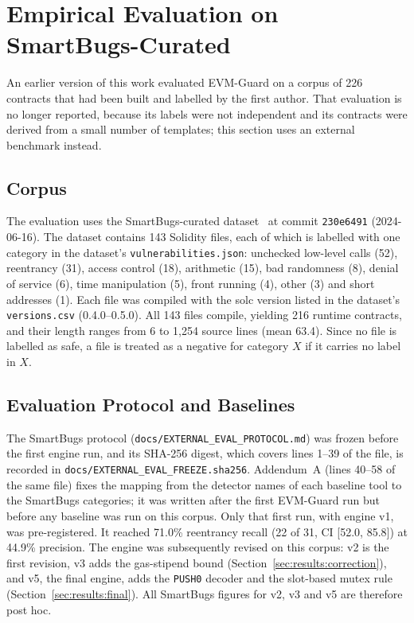 \documentclass[pdflatex,sn-mathphys]{sn-jnl}
\theoremstyle{thmstyletwo}
\theoremstyle{thmstyletwo}
\begin{document}
\section{Empirical Evaluation on SmartBugs-Curated}\label{sec:results}

An earlier version of this work evaluated EVM-Guard on a corpus of 226 contracts that had been built and labelled by the first author. That evaluation is no longer reported, because its labels were not independent and its contracts were derived from a small number of templates; this section uses an external benchmark instead.

\subsection{Corpus}\label{sec:results:corpus}
The evaluation uses the SmartBugs-curated dataset~\cite{durieux2020empirical,ferreira2020smartbugs} at commit \texttt{230e6491} (2024-06-16). The dataset contains 143 Solidity files, each of which is labelled with one category in the dataset's \texttt{vulnerabilities.json}: unchecked low-level calls (52), reentrancy (31), access control (18), arithmetic (15), bad randomness (8), denial of service (6), time manipulation (5), front running (4), other (3) and short addresses (1). Each file was compiled with the solc version listed in the dataset's \texttt{versions.csv} (0.4.0--0.5.0). All 143 files compile, yielding 216 runtime contracts, and their length ranges from 6 to 1,254 source lines (mean 63.4). Since no file is labelled as safe, a file is treated as a negative for category $X$ if it carries no label in $X$.

\subsection{Evaluation Protocol and Baselines}\label{sec:results:protocol}
The SmartBugs protocol (\texttt{docs/EXTERNAL\_EVAL\_PROTOCOL.md}) was frozen before the first engine run, and its SHA-256 digest, which covers lines 1--39 of the file, is recorded in \texttt{docs/EXTERNAL\_EVAL\_FREEZE.sha256}. Addendum~A (lines 40--58 of the same file) fixes the mapping from the detector names of each baseline tool to the SmartBugs categories; it was written after the first EVM-Guard run but before any baseline was run on this corpus. Only that first run, with engine v1, was pre-registered. It reached 71.0\% reentrancy recall (22 of 31, CI [52.0, 85.8]) at 44.9\% precision. The engine was subsequently revised on this corpus: v2 is the first revision, v3 adds the gas-stipend bound (Section~\ref{sec:results:correction}), and v5, the final engine, adds the \texttt{PUSH0} decoder and the slot-based mutex rule (Section~\ref{sec:results:final}). All SmartBugs figures for v2, v3 and v5 are therefore post hoc.
\end{document}
